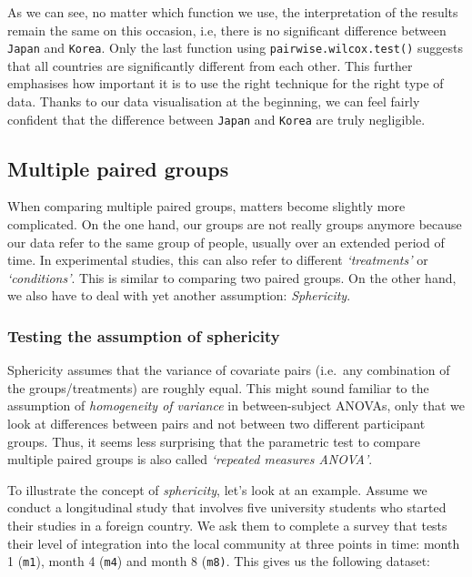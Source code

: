 \documentclass[
  letterpaper,
  DIV=11,
  numbers=noendperiod]{scrreprt}
\begin{document}
As we can see, no matter which function we use, the interpretation of
the results remain the same on this occasion, i.e, there is no
significant difference between \texttt{Japan} and \texttt{Korea}. Only
the last function using \texttt{pairwise.wilcox.test()} suggests that
all countries are significantly different from each other. This further
emphasises how important it is to use the right technique for the right
type of data. Thanks to our data visualisation at the beginning, we can
feel fairly confident that the difference between \texttt{Japan} and
\texttt{Korea} are truly negligible.

\subsection{Multiple paired groups}\label{sec-multiple-paired-groups}

When comparing multiple paired groups, matters become slightly more
complicated. On the one hand, our groups are not really groups anymore
because our data refer to the same group of people, usually over an
extended period of time. In experimental studies, this can also refer to
different \emph{`treatments'} or \emph{`conditions'}. This is similar to
comparing two paired groups. On the other hand, we also have to deal
with yet another assumption: \emph{Sphericity}.

\subsubsection{Testing the assumption of
sphericity}\label{sec-sphericity}

Sphericity assumes that the variance of covariate pairs (i.e.~any
combination of the groups/treatments) are roughly equal. This might
sound familiar to the assumption of \emph{homogeneity of variance} in
between-subject ANOVAs, only that we look at differences between pairs
and not between two different participant groups. Thus, it seems less
surprising that the parametric test to compare multiple paired groups is
also called \emph{`repeated measures ANOVA'}.

To illustrate the concept of \emph{sphericity}, let's look at an
example. Assume we conduct a longitudinal study that involves five
university students who started their studies in a foreign country. We
ask them to complete a survey that tests their level of integration into
the local community at three points in time: month 1 (\texttt{m1}),
month 4 (\texttt{m4}) and month 8 (\texttt{m8)}. This gives us the
following dataset:
\end{document}

